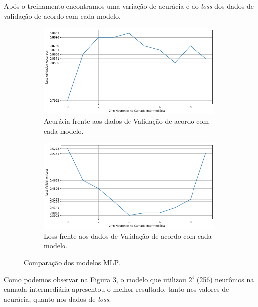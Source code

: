 \documentclass[12pt]{article}
\begin{document}
\pagebreak
Após o treinamento encontramos uma variação de acurácia e do \textit{loss} dos dados de validação de acordo com cada modelo.


\begin{figure}[H]
	\begin{subfigure}{0.49\linewidth}
		\centering
		\includegraphics[width=\linewidth]{Imagens/best_acc_models.png}
		\caption{Acurácia frente aos dados de Validação de acordo com cada modelo.}
		\label{fig:best_acc_models}
	\end{subfigure}
	\hfill
	\begin{subfigure}{0.49\linewidth}
		\centering
		\includegraphics[width=\linewidth]{Imagens/best_loss_models.png}
		\caption{Loss frente aos dados de Validação de acordo com cada modelo.}
		\label{fig:best_loss_models}
	\end{subfigure}
	\caption{Comparação dos modelos MLP.}
	\label{fig:comp_mlp}
\end{figure}


Como podemos observar na Figura \ref{fig:comp_mlp}, o modelo que utilizou $2^4$ (256) neurônios na camada intermediária apresentou o melhor resultado, tanto nos valores de acurácia, quanto nos dados de \textit{loss}.
\end{document}
